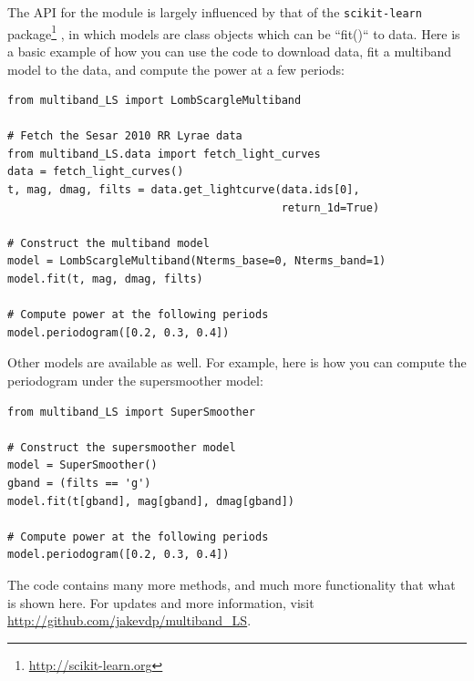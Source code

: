 \documentclass[12pt,preprint]{aastex}
\begin{document}
The API for the module is largely influenced by that of the {\tt scikit-learn} package\footnote{\url{http://scikit-learn.org}} \citep{scikit-learn}, in which models are class objects which can be ``fit()`` to data.
Here is a basic example of how you can use the code to download data, fit a multiband model to the data, and compute the power at a few periods:

\begin{lstlisting}
from multiband_LS import LombScargleMultiband

# Fetch the Sesar 2010 RR Lyrae data
from multiband_LS.data import fetch_light_curves
data = fetch_light_curves()
t, mag, dmag, filts = data.get_lightcurve(data.ids[0],
                                          return_1d=True)

# Construct the multiband model
model = LombScargleMultiband(Nterms_base=0, Nterms_band=1)
model.fit(t, mag, dmag, filts)

# Compute power at the following periods
model.periodogram([0.2, 0.3, 0.4])
\end{lstlisting}

Other models are available as well. For example, here is how you can compute the periodogram under the supersmoother model:

\begin{lstlisting}
from multiband_LS import SuperSmoother

# Construct the supersmoother model
model = SuperSmoother()
gband = (filts == 'g')
model.fit(t[gband], mag[gband], dmag[gband])

# Compute power at the following periods
model.periodogram([0.2, 0.3, 0.4])
\end{lstlisting}

The code contains many more methods, and much more functionality that what is shown here. For updates and more information, visit \url{http://github.com/jakevdp/multiband_LS}.
\end{document}
